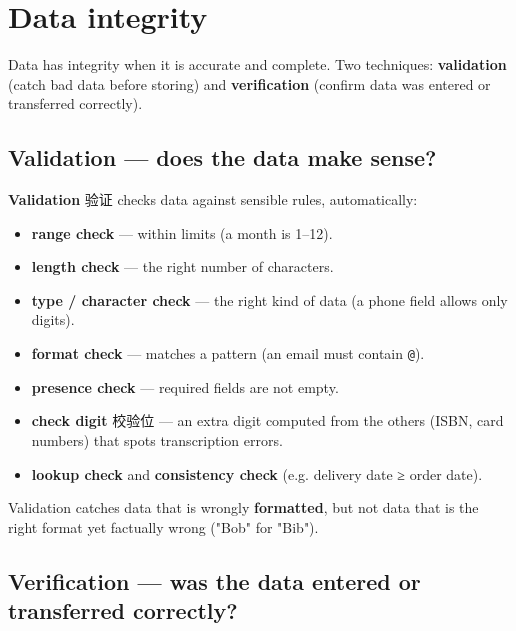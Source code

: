 \documentclass[11pt]{article}
\begin{document}
\section*{Data integrity}

Data has integrity when it is accurate and complete. Two techniques: \textbf{validation} (catch bad data before storing) and \textbf{verification} (confirm data was entered or transferred correctly).

\subsection*{Validation — does the data make sense?}

\textbf{Validation} 验证 checks data against sensible rules, automatically:

\begin{itemize}
\item \textbf{range check} — within limits (a month is 1–12).

\item \textbf{length check} — the right number of characters.

\item \textbf{type / character check} — the right kind of data (a phone field allows only digits).

\item \textbf{format check} — matches a pattern (an email must contain \texttt{@}).

\item \textbf{presence check} — required fields are not empty.

\item \textbf{check digit} 校验位 — an extra digit computed from the others (ISBN, card numbers) that spots transcription errors.

\item \textbf{lookup check} and \textbf{consistency check} (e.g. delivery date ≥ order date).

\end{itemize}

Validation catches data that is wrongly \textbf{formatted}, but not data that is the right format yet factually wrong ("Bob" for "Bib").

\subsection*{Verification — was the data entered or transferred correctly?}
\end{document}
